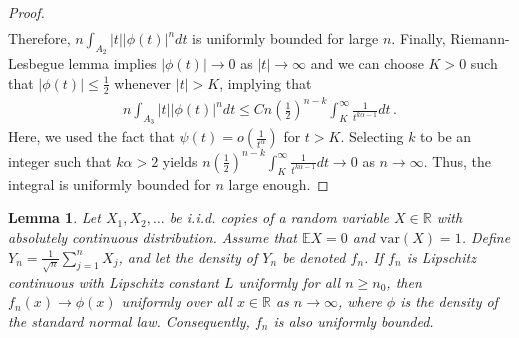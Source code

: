 \documentclass[12pt]{article}
\newcommand\var{\mathrm{var}}
\def\l{\left}
\def\r{\right}
\newcommand{\mb}{\mathbb}
\newtheorem{lemma}{Lemma}
\theoremstyle{thmstyletwo}%
\theoremstyle{thmstylethree}%
\begin{document}
\begin{proof}
\begin{align*}
    \end{align*}
    Therefore, $n \int_{A_2} |t| \l\lvert \phi\l(t\r) \r\rvert^n dt$ is uniformly bounded for large $n$. Finally, Riemann-Lesbegue lemma implies $\lvert\phi(t) \rvert \rightarrow0$ as $\lvert t\rvert \rightarrow \infty$ and we can choose $K>0$ such that $\lvert \phi(t) \rvert \leq \frac{1}{2}$ whenever $\lvert t\rvert > K$, implying that
    \begin{align*}
        n \int_{A_3} |t| \l\lvert \phi\l(t\r) \r\rvert^n dt \leq Cn \l(\frac{1}{2}\r)^{n - k} \int_K^\infty \frac{1}{t^{k\alpha - 1}} dt\,.
    \end{align*}
    Here, we used the fact that $\psi(t) = o\l(\frac{1}{t^\alpha}\r)$ for $t > K$. Selecting $k$ to be an integer such that $k\alpha > 2$ yields $n \l(\frac{1}{2}\r)^{n - k} \int_K^\infty \frac{1}{t^{k\alpha - 1}} dt \rightarrow 0$ as $n \rightarrow \infty$. Thus, the integral is uniformly bounded for $n$ large enough.
\end{proof}


\begin{lemma}
\label{lemma:implication-of-uniform-lipschitz}
Let $X_1, X_2,\ldots$ be i.i.d. copies of a random variable $X \in \mb R$ with absolutely continuous distribution. Assume that $\mb E X= 0$ and $\var(X) = 1$. Define $Y_n = \frac{1}{\sqrt{n}}\sum_{j=1}^n X_j$, and let the density of $Y_n$ be denoted $f_n$. If $f_n$ is Lipschitz continuous with Lipschitz constant $L$ uniformly for all $n \geq n_0$, then $f_n(x) \rightarrow \phi(x)$ uniformly over all $x \in \mb R$ as $n \rightarrow \infty$, where $\phi$ is the density of the standard normal law. Consequently, $f_n$ is also uniformly bounded.
\end{lemma}
\end{document}
